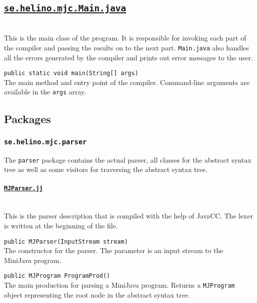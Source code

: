 \documentclass[11pt,oneside,a4paper]{article}
\newcommand{\code}[1]{\texttt{#1}}
\newcommand{\file}[1]{\texttt{#1}}
\newcommand{\class}[1]{\underline{\texttt{#1}}}
\begin{document}
\subsection{\class{se.helino.mjc.Main.java}} \hfill \\
This is the main class of the program. It is responsible for invoking each part
of the compiler and passing the results on to the next part. \file{Main.java} 
also handles all the errors generated by the compiler and prints out error
messages to the user.
\begin{description}
    \item{\code{public static void main(String[] args)}} \hfill \\
        The main method and entry point of the compiler. Command-line arguments
        are available in the \code{args} array.
\end{description}

\subsection{Packages}

\subsubsection{\code{se.helino.mjc.parser}}
The \code{parser} package contains the actual parser, all classes for the 
abstract syntax tree as well as some visitors for traversing the abstract 
syntax tree.

\paragraph{\class{MJParser.jj}} \hfill \\
This is the parser description that is compiled with the help of JavaCC. The
lexer is written at the beginning of the file.
\begin{description}
    \item{\code{public MJParser(InputStream stream)}} \hfill \\
        The constructor for the parser. The parameter is an input stream to the
        MiniJava program.

    \item{\code{public MJProgram ProgramProd()}} \hfill \\
        The main production for parsing a MiniJava program. Returns a
        \code{MJProgram}
        object representing the root node in the abstract syntax tree.
\end{description}
\end{document}
